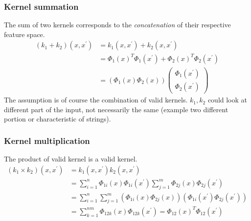 \subsubsection{Kernel summation}
The sum of two kernels corresponds to the \textit{concatenation} of their respective
feature space.
\[
	\begin{aligned}
		\left(k_{1}+k_{2}\right)\left(x, x^{\prime}\right) & =k_{1}\left(x, x^{\prime}\right)+k_{2}\left(x, x^{\prime}\right)                                                                            \\
		                                                   & =\Phi_{1}(x)^{T} \Phi_{1}\left(x^{\prime}\right)+\Phi_{2}(x)^{T} \Phi_{2}\left(x^{\prime}\right)                                            \\
		                                                   & =\left(\Phi_{1}(x) \Phi_{2}(x)\right)\left(\begin{array}{c}\Phi_1\left(x^{\prime}\right) \\ \Phi_2\left(x^{\prime}\right)\end{array}\right)
	\end{aligned}
\]
The assumption is of course the combination of valid kernels. $k_{1}, k_{2}$ could
look at different part of the input, not necessarily the same (example two different
portion or characteristic of strings).

\subsubsection{Kernel multiplication}
The product of valid kernel is a valid kernel.
\begin{equation*}
	\begin{aligned}
		\left(k_{1} \times k_{2}\right)\left(x, x^{\prime}\right) & =k_{1}\left(x, x^{\prime}\right) k_{2}\left(x, x^{\prime}\right)                                                                                       \\
		                                                          & =\sum_{i=1}^{n} \Phi_{1 i}(x) \Phi_{1 i}\left(x^{\prime}\right) \sum_{j=1}^{m} \Phi_{2 j}(x) \Phi_{2 j}\left(x^{\prime}\right)                         \\
		                                                          & =\sum_{i=1}^{n} \sum_{j=1}^{m}\left(\Phi_{1 i}(x) \Phi_{2 j}(x)\right)\left(\Phi_{1 i}\left(x^{\prime}\right) \Phi_{2 j}\left(x^{\prime}\right)\right) \\
		                                                          & =\sum_{k=1}^{n m}\Phi_{12 k}(x) \Phi_{12 k}\left(x^{\prime}\right)=\Phi_{12}(x)^{T} \Phi_{12}\left(x^{\prime}\right)
	\end{aligned}
\end{equation*}

